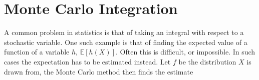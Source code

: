 






\section{Monte Carlo Integration}
A common problem in statistics is that of taking an integral with respect to a stochastic variable. One such example is that of finding the expected value of a function of a variable $h$, $\mathbb{E}[h(X)]$. Often this is difficult, or impossible. In such cases the expectation has to be estimated instead. Let $f$ be the distribution $X$ is drawn from, the Monte Carlo method then finds the estimate 

